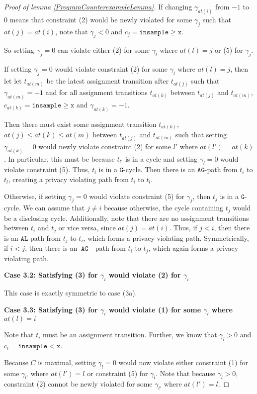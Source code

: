 \documentclass[12pt]{article}
\newcommand{\gguard}[1][x]{\texttt{insample}\geq #1}
\newcommand{\lguard}[1][x]{\texttt{insample} < #1}
\theoremstyle{definition}
\begin{document}
\begin{proof}[Proof of lemma \ref{ProgramCounterexampleLemma}]
    If changing $\gamma_{at(i)}$ from $-1$ to $0$ means that constraint (2) would be newly violated for some $\gamma_j$ such that $at(j) = at(i)$, note that $\gamma_j < 0$ and $c_j = \gguard[\texttt{x}]$. 
    
    So setting $\gamma_j = 0$ can violate either (2) for some $\gamma_l$ where $at(l) = j$ or (5) for $\gamma_j$. 

    If setting $\gamma_j = 0$ would violate constraint (2) for some $\gamma_l$ where $at(l) = j$, then let let $t_{at(m)}$ be the latest assignment transition after $t_{at(j)}$ such that $\gamma_{at(m)} = -1$ and for all assignment transitions $t_{at(k)}$ between $t_{at(j)}$ and $t_{at(m)}$, $c_{at(k)} = \gguard[\texttt{x}]$ and $\gamma_{at(k)} = -1$. 
    
    Then there must exist some assignment transition $t_{at(k)}$, $at(j)\leq at(k)\leq at(m)$ between $t_{at(j)}$ and $t_{at(m)}$ such that setting $\gamma_{at(k)} = 0$ would newly violate constraint (2) for some $l'$ where $at(l') = at(k)$. 
    In particular, this must be because $t_{l'}$ is in a cycle and setting $\gamma_l = 0$ would violate constraint (5). Thus, $t_l$ is in a $\texttt{G}$-cycle. Then there is an $\texttt{AG}$-path from $t_i$ to $t_l$, creating a privacy violating path from $t_i$ to $t_l$. 

    Otherwise, if setting $\gamma_j = 0$ would violate constraint (5) for $\gamma_j$, then $t_j$ is in a $\texttt{G}$-cycle. We can assume that $j\neq i$ because otherwise, the cycle containing $t_j$ would be a disclosing cycle. Additionally, note that there are no assignment transitions between $t_i$ and $t_j$ or vice versa, since $at(j) = at(i)$.
    Thus, if $j<i$, then there is an $\texttt{AL}$-path from $t_j$ to $t_i$, which forms a privacy violating path. Symmetrically, if $i<j$, then there is an $\texttt{AG}-$path from $t_i$ to $t_j$, which again forms a privacy violating path. 

    \textbf{Case 3.2: Satisfying (3) for $\gamma_i$ would violate (2) for $\gamma_i$}

    This case is exactly symmetric to case (3a).

    \textbf{Case 3.3: Satisfying (3) for $\gamma_i$ would violate (1) for some $\gamma_l$ where $at(l) = i$}

    Note that $t_i$ must be an assignment transition. Further, we know that $\gamma_l>0$ and $c_l = \lguard[\texttt{x}]$. 
    
    Because $C$ is maximal, setting $\gamma_l=0$ would now violate either constraint (1) for some $\gamma_{l'}$ where $at(l') = l$ or constraint (5) for $\gamma_l$. Note that because $\gamma_l>0$, constraint (2) cannot be newly violated for some $\gamma_{l'}$ where $at(l') = l$.


\end{proof}
\end{document}

